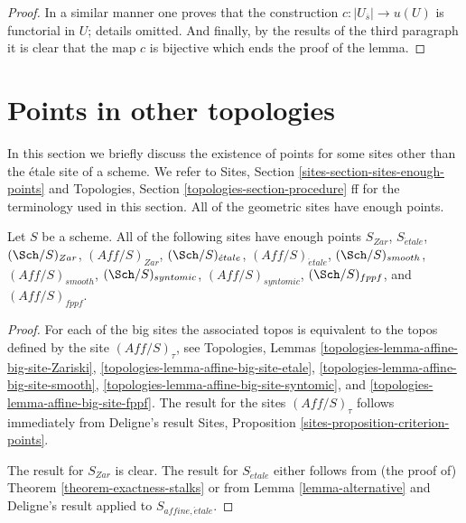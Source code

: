 \begin{proof}
\medskip\noindent
In a similar manner one proves that the construction
$c : |U_{\overline{s}}| \to u(U)$ is functorial in $U$;
details omitted. And finally, by the results of the
third paragraph it is clear that the map $c$ is bijective
which ends the proof of the lemma.
\end{proof}







\section{Points in other topologies}
\label{section-points-topologies}

\noindent
In this section we briefly discuss the existence of points for some
sites other than the \'etale site of a scheme. We refer to
Sites, Section \ref{sites-section-sites-enough-points}
and
Topologies, Section \ref{topologies-section-procedure} ff
for the terminology used in this section.
All of the geometric sites have enough points.

\begin{lemma}
\label{lemma-points-fppf}
Let $S$ be a scheme. All of the following sites have enough points
$S_{Zar}$, $S_{\acute{e}tale}$,
$(\Sch/S)_{Zar}$, $(\textit{Aff}/S)_{Zar}$,
$(\Sch/S)_{\acute{e}tale}$, $(\textit{Aff}/S)_{\acute{e}tale}$,
$(\Sch/S)_{smooth}$, $(\textit{Aff}/S)_{smooth}$,
$(\Sch/S)_{syntomic}$, $(\textit{Aff}/S)_{syntomic}$,
$(\Sch/S)_{fppf}$, and $(\textit{Aff}/S)_{fppf}$.
\end{lemma}

\begin{proof}
For each of the big sites the associated topos is equivalent to the
topos defined by the site $(\textit{Aff}/S)_\tau$, see
Topologies, Lemmas \ref{topologies-lemma-affine-big-site-Zariski},
\ref{topologies-lemma-affine-big-site-etale},
\ref{topologies-lemma-affine-big-site-smooth},
\ref{topologies-lemma-affine-big-site-syntomic}, and
\ref{topologies-lemma-affine-big-site-fppf}.
The result for the sites $(\textit{Aff}/S)_\tau$ follows immediately
from Deligne's result
Sites, Proposition \ref{sites-proposition-criterion-points}.

\medskip\noindent
The result for $S_{Zar}$ is clear. The result for $S_{\acute{e}tale}$
either follows from (the proof of)
Theorem \ref{theorem-exactness-stalks}
or from
Lemma \ref{lemma-alternative}
and Deligne's result applied to $S_{affine, \acute{e}tale}$.
\end{proof}

